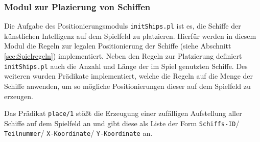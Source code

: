 \subsubsection{Modul zur Plazierung von Schiffen} \label{sec:initships}	
	Die Aufgabe des Positionierungsmoduls \texttt{initShips.pl} ist es, die Schiffe der künstlichen Intelligenz auf dem Spielfeld zu platzieren.
	Hierfür werden in diesem Modul die Regeln zur legalen Positionierung der Schiffe (siehe Abschnitt \ref{sec:Spielregeln}) implementiert. Neben den Regeln 
	zur Platzierung definiert \texttt{initShips.pl} auch die Anzahl und Länge der im Spiel genutzten Schiffe. Des weiteren wurden Prädikate implementiert, 
	welche die Regeln auf die Menge der Schiffe anwenden, um so mögliche Positionierungen dieser auf dem Spielfeld zu erzeugen.
	
	Das Prädikat \texttt{place/1} stößt die Erzeugung einer zufälligen Aufstellung aller Schiffe auf dem Spielfeld an und gibt diese als Liste der Form 
	\texttt{Schiffs-ID}/ \texttt{Teilnummer}/ \texttt{X-Koordinate}/ \texttt{Y-Koordinate} an.
	
